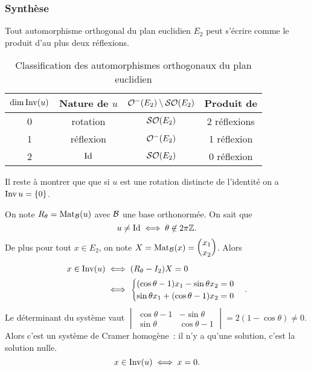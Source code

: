 \subsubsection{Synthèse}

\begin{theo}
  Tout automorphisme orthogonal du plan euclidien \(E_2\) peut s'écrire 
  comme le produit d'au plus deux réflexions.
  \begin{table}[!h]
    \centering
    \begin{tabular}{|c|c|c|c|}\hline
      \(\operatorname{dim}\operatorname{Inv}(u)\) & Nature de \(u\) & 
      \(\mathcal{O}^{-}\!\left(E_2\right)\setminus\mathcal{SO}\!\left(E_2\right)\)& Produit de \\ \hline
      0 & rotation & \(\mathcal{SO}\!\left(E_2\right)\) & 2 réflexions \\
      1 & réflexion & \(\mathcal{O}^{-}\!\left(E_2\right)\) & 1 réflexion \\
      2 & \(\operatorname{Id}\) & \(\mathcal{SO}\!\left(E_2\right)\) & 0 réflexion \\ \hline
    \end{tabular}
    \caption{Classification des automorphismes orthogonaux du plan 
    euclidien}
    \label{tab:ClassOrth}
  \end{table}
\end{theo}

Il reste à montrer que  que si \(u\) est une rotation distincte de 
l'identité on a \(\operatorname{Inv} u =\{0\}\). 

On note \(R_\theta=\mathrm{Mat}_{\mathcal{B}}(u)\) avec \(\mathcal{B}\) une base orthonormée. On sait 
que
\begin{equation}
  u \neq \operatorname{Id} \iff \theta \not\in 2\pi\mathbb{Z}.
\end{equation}
De plus pour tout \(x \in E_2\), on note \(X=\mathrm{Mat}_{\mathcal{B}}(x)=\begin{pmatrix} x_1 
\\ x_2 \end{pmatrix}\). Alors
\begin{align*}
  x \in \operatorname{Inv}(u) &\iff (R_\theta-I_2)X=0 \\
  &\iff \begin{cases} (\cos\theta -1)x_1 -\sin\theta x_2 = 0 \\ \sin\theta 
  x_1 +(\cos\theta -1)x_2=0 \end{cases}.
\end{align*}
Le déterminant du système vaut \(\begin{vmatrix} \cos\theta -1 & -\sin\theta 
\\ \sin\theta & \cos\theta -1\end{vmatrix} = 2(1-\cos\theta)\neq 0\). Alors 
c'est un système de Cramer homogène~: il n'y a qu'une solution, c'est la 
solution nulle.
\begin{equation}
  x \in \operatorname{Inv}(u) \iff x=0.
\end{equation}

